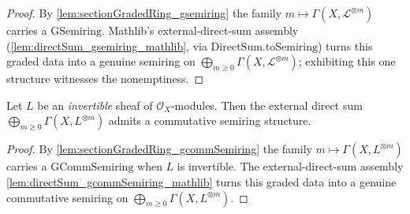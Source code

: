 \begin{proof}
  \leanok
  By \cref{lem:sectionGradedRing_gsemiring} the family \(m \mapsto
  \Gamma(X,\mathcal{L}^{\otimes m})\) carries a \(\mathrm{GSemiring}\). Mathlib's
  external-direct-sum assembly (\cref{lem:directSum_gsemiring_mathlib}, via
  \(\mathrm{DirectSum.toSemiring}\)) turns this graded data into a genuine semiring
  on \(\bigoplus_{m \ge 0} \Gamma(X,\mathcal{L}^{\otimes m})\); exhibiting this one
  structure witnesses the nonemptiness.
\end{proof}

\begin{lemma}\leanok
  \label{lem:sectionGradedRing_commSemiring_nonempty}
  Let \(L\) be an \emph{invertible} sheaf of \(\mathcal{O}_X\)-modules. Then the
  external direct sum \(\bigoplus_{m \ge 0} \Gamma(X, L^{\otimes m})\) admits a
  commutative semiring structure.
\end{lemma}

\begin{proof}
  \leanok
  By \cref{lem:sectionGradedRing_gcommSemiring} the family \(m \mapsto
  \Gamma(X, L^{\otimes m})\) carries a \(\mathrm{GCommSemiring}\) when \(L\) is
  invertible. The external-direct-sum assembly
  \cref{lem:directSum_gcommSemiring_mathlib} turns this graded data into a genuine
  commutative semiring on \(\bigoplus_{m \ge 0} \Gamma(X, L^{\otimes m})\).
\end{proof}


